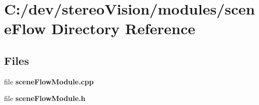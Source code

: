 \section{C\+:/dev/stereo\+Vision/modules/scene\+Flow Directory Reference}
\label{dir_abac25be6e9586a73e0319a6df944064}
\subsection*{Files}
\begin{DoxyCompactItemize}
\item 
file {\bfseries scene\+Flow\+Module.\+cpp}
\item 
file {\bfseries scene\+Flow\+Module.\+h}
\end{DoxyCompactItemize}
